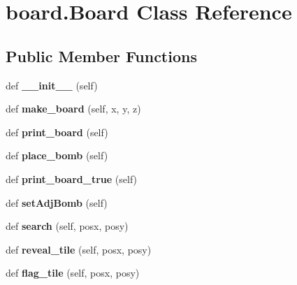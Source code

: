 \hypertarget{classboard_1_1_board}{}\section{board.\+Board Class Reference}
\label{classboard_1_1_board}
\subsection*{Public Member Functions}
\begin{DoxyCompactItemize}
\item 
\mbox{\label{classboard_1_1_board_a35203bbf9b43a84ecfea81eb7cbe66fd}} 
def {\bfseries \+\_\+\+\_\+init\+\_\+\+\_\+} (self)
\item 
\mbox{\label{classboard_1_1_board_ad8ae45ae3897296e325afbeb0ae8ae18}} 
def {\bfseries make\+\_\+board} (self, x, y, z)
\item 
\mbox{\label{classboard_1_1_board_aefc9d1d94c291d150c7cc4f171156238}} 
def {\bfseries print\+\_\+board} (self)
\item 
\mbox{\label{classboard_1_1_board_a80bb62a7dcf8e358084082ff6ea730e7}} 
def {\bfseries place\+\_\+bomb} (self)
\item 
\mbox{\label{classboard_1_1_board_a71c3995ac93cb4f40abdb1c684b6cafd}} 
def {\bfseries print\+\_\+board\+\_\+true} (self)
\item 
\mbox{\label{classboard_1_1_board_a2a2634ef64e8ae39381583c459c5026d}} 
def {\bfseries set\+Adj\+Bomb} (self)
\item 
\mbox{\label{classboard_1_1_board_a420310ce5c8eb10a889a3e583783b9e9}} 
def {\bfseries search} (self, posx, posy)
\item 
\mbox{\label{classboard_1_1_board_a2d186854c045a32d53a302e5d73d480e}} 
def {\bfseries reveal\+\_\+tile} (self, posx, posy)
\item 
\mbox{\label{classboard_1_1_board_aabde992af88c3219259f21f4217b0d83}} 
def {\bfseries flag\+\_\+tile} (self, posx, posy)
\end{DoxyCompactItemize}

